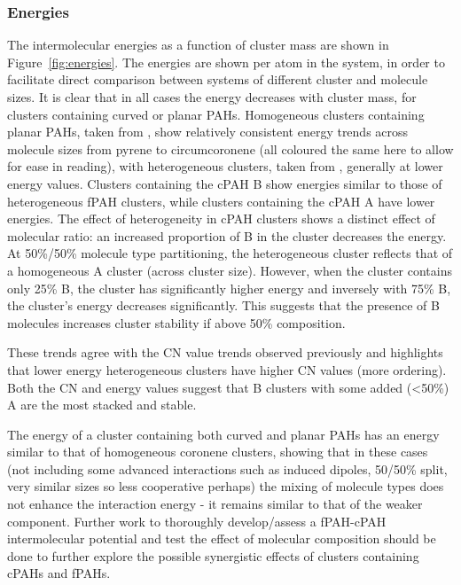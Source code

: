 \subsubsection{Energies}
The intermolecular energies as a function of cluster mass are shown in Figure~\ref{fig:energies}.  The energies are shown per atom in the system, in order to facilitate direct comparison between systems of different cluster and molecule sizes. It is clear that in all cases the energy decreases with cluster mass, for clusters containing curved or planar PAHs. Homogeneous clusters containing planar PAHs, taken from \citet{chen2014size,chen2015solid}, show relatively consistent energy trends across molecule sizes from pyrene to circumcoronene (all coloured the same here to allow for ease in reading), with heterogeneous clusters, taken from \citet{bowal2018partitioning}, generally at lower energy values. Clusters containing the cPAH B show energies similar to those of heterogeneous fPAH clusters, while clusters containing the cPAH A have lower energies.
The effect of heterogeneity in cPAH clusters shows a distinct effect of molecular ratio: an increased proportion of B in the cluster decreases the energy. At 50\%/50\% molecule type partitioning, the heterogeneous cluster reflects that of a homogeneous A cluster (across cluster size). However, when the cluster contains only 25\% B, the cluster has significantly higher energy and inversely with 75\% B, the cluster's energy decreases significantly.  This suggests that the presence of B molecules increases cluster stability if above 50\% composition.

These trends agree with the CN value trends observed previously and highlights that lower energy heterogeneous clusters have higher CN values (more ordering). %
Both the CN and energy values suggest that B clusters with some added (<50\%) A are the most stacked and stable.

The energy of a cluster containing both curved and planar PAHs has an energy similar to that of homogeneous coronene clusters, showing that in these cases (not including some advanced interactions such as induced dipoles, 50/50\% split, very similar sizes so less cooperative perhaps) the mixing of molecule types does not enhance the interaction energy - it remains similar to that of the weaker component.  Further work to thoroughly develop/assess a fPAH-cPAH intermolecular potential and test the effect of molecular composition should be done to further explore the possible synergistic effects of clusters containing cPAHs and fPAHs.

